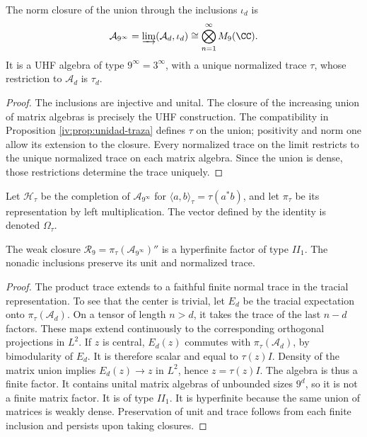 \begin{theorem}
\label{iv:thm:uhf}
The norm closure of the union through the inclusions \(\iota_d\)
is
\[
 \mathcal A_{9^\infty}
 =\varinjlim(\mathcal A_d,\iota_d)
 \cong\bigotimes_{n=1}^{\infty}M_9(\CC).
\]
It is a UHF algebra of type \(9^\infty=3^\infty\), with a unique
normalized trace \(\tau\), whose restriction to \(\mathcal A_d\)
is \(\tau_d\).
\end{theorem}
\begin{proof}
The inclusions are injective and unital. The closure of the increasing
union of matrix algebras is precisely the UHF construction.
The compatibility in Proposition \ref{iv:prop:unidad-traza}
defines \(\tau\) on the union; positivity and norm one allow
its extension to the closure. Every normalized trace on the limit restricts
to the unique normalized trace on each matrix algebra. Since the union
is dense, those restrictions determine the trace uniquely.
\end{proof}

Let \(\mathcal H_\tau\) be the completion of
\(\mathcal A_{9^\infty}\) for
\(\langle a,b\rangle_\tau=\tau(a^*b)\), and let \(\pi_\tau\)
be its representation by left multiplication. The vector defined
by the identity is denoted \(\Omega_\tau\).

\begin{theorem}
\label{iv:thm:factor-tracial}
The weak closure
\(\mathcal R_9=\pi_\tau(\mathcal A_{9^\infty})''\)
is a hyperfinite factor of type \(II_1\). The nonadic
inclusions preserve its unit and normalized trace.
\end{theorem}
\begin{proof}
The product trace extends to a faithful finite normal trace
in the tracial representation. To see that the center is trivial,
let \(E_d\) be the tracial expectation onto \(\pi_\tau(\mathcal A_d)\).
On a tensor of length \(n>d\), it takes the trace of the last
\(n-d\) factors. These maps extend continuously
to the corresponding orthogonal projections in \(L^2\).
If \(z\) is central, \(E_d(z)\) commutes with
\(\pi_\tau(\mathcal A_d)\), by bimodularity of \(E_d\).
It is therefore scalar and equal to \(\tau(z)I\). Density of the
matrix union implies \(E_d(z)\to z\) in \(L^2\), hence
\(z=\tau(z)I\). The algebra is thus a finite factor.
It contains unital matrix algebras of unbounded sizes \(9^d\),
so it is not a finite matrix factor. It is of type \(II_1\).
It is hyperfinite because the same union of matrices is weakly
dense. Preservation of unit and trace follows from each finite
inclusion and persists upon taking closures.
\end{proof}

